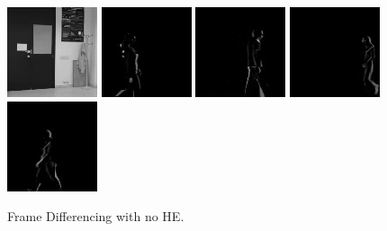    \begin{subfigure}[t]{0.9\textwidth}
        \centering
        \includegraphics[scale=0.7]{figures/LASIESTA-PLAIN-DIFFERENCING/frame0}
        \hfill
        \includegraphics[scale=0.7]{figures/LASIESTA-PLAIN-DIFFERENCING/frame100}
        \hfill
        \includegraphics[scale=0.7]{figures/LASIESTA-PLAIN-DIFFERENCING/frame190}
        \hfill
        \includegraphics[scale=0.7]{figures/LASIESTA-PLAIN-DIFFERENCING/frame250}
        \hfill
        \includegraphics[scale=0.7]{figures/LASIESTA-PLAIN-DIFFERENCING/frame270}
        \caption{Frame Differencing with no HE.}
    \end{subfigure}
    \\ \bigskip
